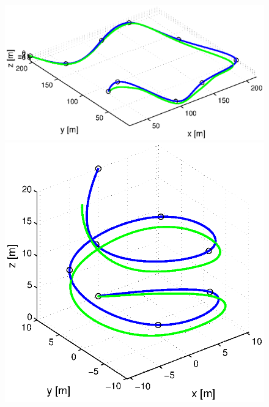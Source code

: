 \begin{figure}[h]
  \begin{minipage}[t]{0.32\textwidth}
    \includegraphics[width = \textwidth]{trackings_wc/figure_3D_road_SplineDegree3_trajectoryFollowing_Disturbance_0}
  \end{minipage}
  \hfill
  \begin{minipage}[t]{0.32\textwidth}
    \includegraphics[width = \textwidth]{trackings_wc/figure_3D_helix_SplineDegree3_trajectoryFollowing_Disturbance_0}
  \end{minipage}
  \hfill
  \begin{minipage}[t]{0.32\textwidth}

\end{minipage}
\end{figure}
